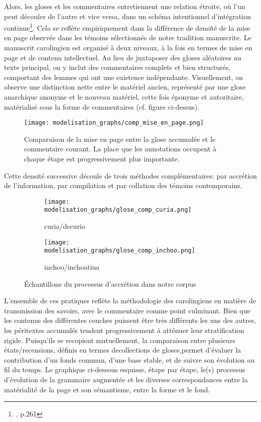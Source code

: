 \documentclass[a4paper, twoside, 12pt]{book}
\begin{document}
Alors, les gloses et les commentaires entretiennent une relation étroite, où l'un peut découler de l'autre et vice versa, dans un schéma intentionnel d'intégration continue\footnote{\cite{holtz1978typologie}, p.261}. Cela se reflète empiriquement dans la différence de densité de la mise en page observée dans les témoins sélectionnés de notre tradition manuscrite. Le manuscrit carolingien est organisé à deux niveaux, à la fois en termes de mise en page et de contenu intellectuel. Au lieu de juxtaposer des gloses aléatoires au texte principal, on y inclut des commentaires complets et bien structurés, comportant des lemmes qui ont une existence indépendante. Visuellement, on observe une distinction nette entre le matériel ancien, représenté par une \og{}glose anarchique\fg{} anonyme et le nouveau matériel, cette fois éponyme et autoritaire, matérialisé sous la forme de commentaires (cf. figure ci-dessus).

\begin{figure}[H]
    \centering
    \texttt{[image: modelisation\_graphs/comp\_mise\_en\_page.png]}
    \caption{Comparaison de la mise en page entre la glose accumulée et le commentaire courant. La place que les annotations occupent à chaque étape est progressivement plus importante.}
    \label{fig:comptypologies}
\end{figure}

Cette densité successive découle de trois méthodes complémentaires: par accrétion de l'information, par compilation et par collation des témoins contemporains.  

\begin{figure}[H]
    \begin{subfigure}{0.50\textwidth}
    \centering
    \texttt{[image: modelisation\_graphs/glose\_comp\_curia.png]}
    \caption{curia/decurio}
    \end{subfigure}
    \begin{subfigure}{0.50\linewidth}
    \centering
    \texttt{[image: modelisation\_graphs/glose\_comp\_inchoo.png]}
    \caption{inchoo/inchoatiua}
    \end{subfigure}
    \caption{Échantillons du processus d'accrétion dans notre corpus}
    \label{fig:exemplesaccretion}
\end{figure} 

L'ensemble de ces pratiques reflète la méthodologie des carolingiens en matière de transmission des savoirs, avec le commentaire comme point culminant. Bien que les contenus des différentes couches puissent être très différents les uns des autres, les péritextes accumulés tendent progressivement à atténuer leur stratification rigide. 
Puisqu'ils se recopient mutuellement, la comparaison entre plusieurs états/recensions, définis en termes de\og{}collections de gloses\fg{},permet d'évaluer la contribution d'un fonds commun, d'une base stable, et de suivre son évolution au fil du temps. Le graphique ci-dessous esquisse, étape par étape, le(s) processus d'évolution de la grammaire \og{}augmentée\fg{} et les diverses correspondances entre la matérialité de la page et son sémantisme, entre la forme et le fond.\\
\end{document}
